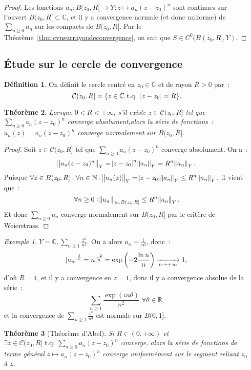 \documentclass{report}
\newtheorem{thm}{Théorème}[chapter]
\theoremstyle{definition}
\newtheorem{déf}[thm]{Définition}
\theoremstyle{remark}
\newtheorem{ex}{Exemple}[chapter]
\newcommand{\C}{\mathbb C}
\newcommand{\R}{\mathbb R}
\newcommand{\N}{\mathbb N}
\newcommand{\tq}{\text{ t.q. }}
\newcommand{\pinfty}{{+\infty}}
\begin{document}
			\begin{proof} Les fonctions $u_n : B(z_0, R[ \to Y : z \mapsto a_n(z - z_0)^n$ sont continues sur l'ouvert $B(z_0, R[ \subset \C$, et il y a
			convergence normale (et donc uniforme) de $\sum_{n \geq 0}u_n$ sur les compacts de $B(z_0, R[$. Par le Théorème~\ref{thm:cvnsurrayondeconvergence},
			on sait que $S \in C^0(B(z_0, R[, Y)$.
			\end{proof}
		\subsection{Étude sur le cercle de convergence}
			\begin{déf} On définit le cercle centré en $z_0 \in \C$ et de rayon $R > 0$ par~:
			\[\mathcal C(z_0, R] = \{z \in \C \tq \abs {z - z_0} = R\}.\]
			\end{déf}

			\begin{thm}Lorsque $0 < R < \pinfty$, s'il existe $z \in \mathcal C(z_0, R]$ tel que $\sum_{n \geq 0}a_n(z - z_0)^n$ converge absolument,alors la
			série de fonctions~: $u_n(z) = a_n(z - z_0)^n$ converge normalement sur $B(z_0, R]$.
			\end{thm}

			\begin{proof} Soit $z \in \mathcal C(z_0, R]$ tel que $\sum_{n \geq 0}a_n(z - z_0)^n$ converge absolument. On a~:
			\[\norm {a_n(z - z_0)^n}_Y = \abs {z - z_0}^n\norm {a_n}_Y = R^n\norm {a_n}_Y.\]
			Puisque $\forall z \in B(z_0, R] : \forall n \in \N : \norm {u_n(z)}_Y = \abs {z - z_0}\norm {a_n}_Y \leq R^n\norm {a_n}_Y,$
			il vient que~:
			\[\forall n \geq 0 : \norm {u_n}_{\infty, B(z_0, R]} \leq R^n\norm {a_n}_Y.\]
			Et donc $\sum_{n \geq 0}u_n$ converge normalement sur $B(z_0, R]$ par le critère de Weierstrass.
			\end{proof}

			\begin{ex} $Y = \C, \sum_{n \geq 1}\frac {z^n}{n^2}$. On a alors $a_n = \frac 1{n^2}$, donc~:
			\[\abs {a_n}^{\frac 1n} = n^{\frac {-2}n} = \exp\left(-2\frac {\ln n}n\right) \xrightarrow[n \to \pinfty]{} 1,\]
			d'où $R = 1$, et il y a convergence en $z = 1$, donc il y a convergence absolue de la série~:
			\[\sum_{n \geq 1}\frac {\exp(in\theta)}{n^2} \; \forall \theta \in \R,\]
			et la convergence de $\sum_{n \geq 1}\frac {z^n}{n^2}$ est normale sur $B(0, 1]$.
			\end{ex}

			\begin{thm}[Théorème d'Abel]\label{thm:cvgsurcercleimpliquecvusursegment} Si $R \in (0, \pinfty)$ et
			$\exists z \in \mathcal C(z_0, R] \tq \sum_{n \geq 0} a_n(z - z_0)^n$ converge, alors la série de fonctions de terme général
			$z \mapsto a_n(z - z_0)^n$ converge uniformément sur le segment reliant $z_0$ à $z$.
			\end{thm}
\end{document}

